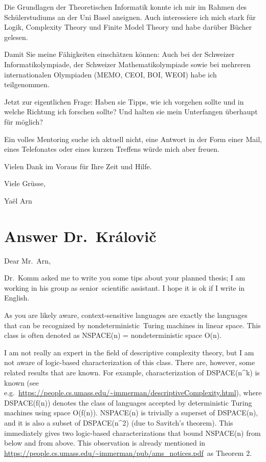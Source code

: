 Die Grundlagen der Theoretischen Informatik konnte ich mir im Rahmen des
Schülerstudiums an der Uni Basel aneignen. Auch interessiere ich mich
stark für Logik, Complexity Theory und Finite Model Theory und habe
darüber Bücher gelesen.

Damit Sie meine Fähigkeiten einschätzen können: Auch bei der Schweizer
Informatikolympiade, der Schweizer Mathematikolympiade sowie bei
mehreren internationalen Olympiaden (MEMO, CEOI, BOI, WEOI) habe ich
teilgenommen.

Jetzt zur eigentlichen Frage: Haben sie Tipps, wie ich vorgehen sollte
und in welche Richtung ich forschen sollte? Und halten sie mein
Unterfangen überhaupt für möglich?

Ein volles Mentoring suche ich aktuell nicht, eine Antwort in der Form
einer Mail, eines Telefonates oder eines kurzen Treffens würde mich aber
freuen.

Vielen Dank im Voraus für Ihre Zeit und Hilfe.

Viele Grüsse,

Yaël Arn

\section{Answer
Dr.~Královi\v{c}}\label{response-dr.-kruxe1loviux10d}

Dear Mr.~Arn,

Dr.~Komm asked me to write you some tips about your planned thesis; I am
working in his group as senior~scientific assistant. I hope it is ok if
I write in English.

As you are likely aware, context-sensitive languages are exactly the
languages that can be recognized by nondeterministic~Turing machines in
linear space. This class is often denoted as NSPACE(n) =
nondeterministic space O(n).

I am not really an expert in the field of descriptive complexity theory,
but I am not aware of logic-based characterization of this class. There
are, however, some related results that are known. For example,
characterization of DSPACE(n\^{}k) is known (see
e.g.~\url{https://people.cs.umass.edu/~immerman/descriptiveComplexity.html}),
where DSPACE(f(n)) denotes the class of languages accepted by
deterministic Turing machines using space O(f(n)). NSPACE(n) is
trivially a superset of DSPACE(n), and it is also a subset of
DSPACE(n\^{}2) (due to Savitch's theorem). This immediately gives two
logic-based characterizations that bound NSPACE(n) from below and from
above. This observation is already mentioned in
\url{https://people.cs.umass.edu/~immerman/pub/ams_notices.pdf}~as
Theorem 2.


